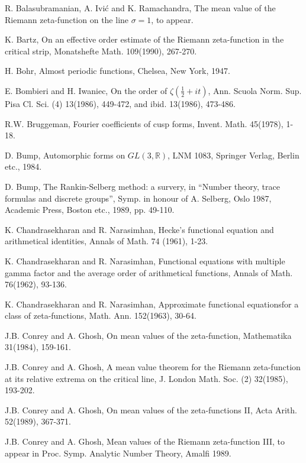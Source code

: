 \begin{thebibliography}{99}
 R. Balasubramanian, A. Ivi\'c and K. Ramachandra, The mean value of the Riemann zeta-function on the line $\sigma =1$, to appear. 

 K. Bartz, On an effective order estimate of the Riemann zeta-function in the critical strip, Monatshefte Math. 109(1990), 267-270.

 H. Bohr, Almost periodic functions, Chelsea, New York, 1947.

 E. Bombieri and H. Iwaniec, On the order of $\zeta(\frac{1}{2} + it)$, Ann. Scuola Norm. Sup. Pisa Cl. Sci. (4) 13(1986), 449-472, and ibid. 13(1986), 473-486.

 R.W. Bruggeman, Fourier coefficients of cusp forms, Invent. Math. 45(1978), 1-18.

 D. Bump, Automorphic forms on $GL(3,\mathbb{R})$, LNM 1083, Springer Verlag, Berlin etc., 1984.

 D. Bump, The Rankin-Selberg method: a survery, in ``Number theory, trace formulas and discrete groups'', Symp. in honour of A. Selberg, Oslo 1987, Academic Press, Boston etc., 1989, pp. 49-110.

 K. Chandrasekharan and R. Narasimhan, Hecke's functional equation and arithmetical identities, Annals of Math. 74 (1961), 1-23.

 K. Chandrasekharan and R. Narasimhan, Functional equations with multiple gamma factor and the average order of arithmetical functions, Annals of Math. 76(1962), 93-136.

 K. Chandrasekharan and R. Narasimhan, Approximate functional equations\pageoriginale for a class of zeta-functions, Math. Ann. 152(1963), 30-64.

 J.B. Conrey and A. Ghosh, On mean values of the zeta-function, Mathematika  31(1984), 159-161.

 J.B. Conrey and A. Ghosh, A mean value theorem for the Riemann zeta-function at its relative extrema on the critical line, J. London Math. Soc. (2) 32(1985), 193-202.

 J.B. Conrey and A. Ghosh, On mean values of the zeta-functions II, Acta Arith. 52(1989), 367-371.

 J.B. Conrey and A. Ghosh, Mean values of the Riemann zeta-function III, to appear in Proc. Symp. Analytic Number Theory, Amalfi 1989.


\end{thebibliography}
